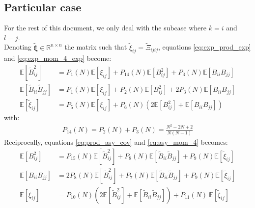 \documentclass[12pt]{scrartcl}
\begin{document}
\subsection{Particular case}
For the rest of this document, we only deal with the subcase where $k=i$ and $l=j$.\\
$ $\\
Denoting $\widetilde{\boldsymbol{\xi}} \in \mathbb{R}^{n \times n}$ the matrix such that $\widetilde{\xi}_{ij} = \widetilde{\Xi}_{ijij}$, equations \eqref{eq:exp_prod_exp} and \eqref{eq:exp_mom_4_exp} become:
\begin{subequations}
\begin{align}
\label{eq:exp_prod_exp_2}
\mathbb{E} \left[\widetilde{B}_{ij}^2\right] & = P_1(N) \mathbb{E} \left[\xi_{ij}\right] + P_{14}(N) \mathbb{E} \left[B^2_{ij}\right] + P_3(N) \mathbb{E} \left[B_{ii} B_{jj}\right] \\
\label{eq:exp_prod_exp_3}
\mathbb{E} \left[\widetilde{B}_{ii} \widetilde{B}_{jj}\right] & = P_1(N) \mathbb{E} \left[\xi_{ij}\right] + P_2(N) \mathbb{E} \left[B^2_{ij}\right] + 2 P_3(N) \mathbb{E} \left[B_{ii} B_{jj}\right] \\
\label{eq:exp_mom_4_exp_2}
\mathbb{E} \left[\widetilde{\xi}_{ij}\right] & = P_5(N) \mathbb{E} \left[\xi_{ij} \right] + P_6(N) \left(2 \mathbb{E} \left[B^2_{ij}\right] + \mathbb{E} \left[B_{ii} B_{jj}\right] \right)
\end{align}
\end{subequations}
with:
\begin{align}
P_{14}(N) = P_2(N) + P_3(N) =  \frac{N^2-2N+2}{N(N-1)}
\end{align}
Reciprocally, equations \eqref{eq:prod_asy_cov} and \eqref{eq:asy_mom_4} becomes:
\begin{subequations}
\begin{align}
\label{eq:prod_asy_cov_exp_2}
\mathbb{E} \left[B^2_{ij}\right] & = P_{15}(N) \mathbb{E} \left[\widetilde{B}^2_{ij}\right] + P_8(N) \mathbb{E} \left[\widetilde{B}_{ii} \widetilde{B}_{jj}\right] + P_9(N) \mathbb{E} \left[\widetilde{\xi}_{ij}\right] \\
\label{eq:prod_asy_cov_exp_3}
\mathbb{E} \left[B_{ii} B_{jj}\right] & = 2P_8(N) \mathbb{E} \left[\widetilde{B}^2_{ij}\right] + P_7(N) \mathbb{E} \left[\widetilde{B}_{ii} \widetilde{B}_{jj}\right] + P_9(N) \mathbb{E} \left[\widetilde{\xi}_{ij}\right] \\
\label{eq:asy_mom_4_exp_2}
\mathbb{E} \left[\xi_{ij}\right] & = P_{10}(N) \left(2 \mathbb{E} \left[\widetilde{B}_{ij}^2\right] + \mathbb{E} \left[\widetilde{B}_{ii} \widetilde{B}_{jj}\right] \right) + P_{11}(N) \ \mathbb{E} \left[\widetilde{\xi}_{ij}\right]
\end{align}
\end{subequations}
\end{document}
